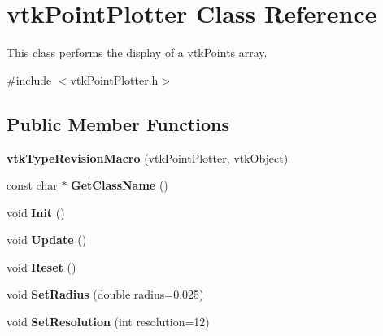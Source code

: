 \hypertarget{classvtkPointPlotter}{
\section{vtkPointPlotter Class Reference}
\label{classvtkPointPlotter}
}


This class performs the display of a vtkPoints array.  


{\ttfamily \#include $<$vtkPointPlotter.h$>$}\subsection*{Public Member Functions}
\begin{DoxyCompactItemize}
\item 
\hypertarget{classvtkPointPlotter_a0708c3a731b70235238305fcec788c9d}{
{\bfseries vtkTypeRevisionMacro} (\hyperlink{classvtkPointPlotter}{vtkPointPlotter}, vtkObject)}
\label{classvtkPointPlotter_a0708c3a731b70235238305fcec788c9d}

\item 
\hypertarget{classvtkPointPlotter_a864e9ad3ebcaae4b6fdedc4c0e666b7b}{
const char $\ast$ {\bfseries GetClassName} ()}
\label{classvtkPointPlotter_a864e9ad3ebcaae4b6fdedc4c0e666b7b}

\item 
\hypertarget{classvtkPointPlotter_a28f6777816c31f9a6934bb7149348e78}{
void {\bfseries Init} ()}
\label{classvtkPointPlotter_a28f6777816c31f9a6934bb7149348e78}

\item 
\hypertarget{classvtkPointPlotter_a086fd3ddc932a01f59596e57e7b80845}{
void {\bfseries Update} ()}
\label{classvtkPointPlotter_a086fd3ddc932a01f59596e57e7b80845}

\item 
\hypertarget{classvtkPointPlotter_a16ab58e612f50555ff575f2b4f00de63}{
void {\bfseries Reset} ()}
\label{classvtkPointPlotter_a16ab58e612f50555ff575f2b4f00de63}

\item 
\hypertarget{classvtkPointPlotter_aeb9ea6d9211adbe11a7acf45ae092a96}{
void {\bfseries SetRadius} (double radius=0.025)}
\label{classvtkPointPlotter_aeb9ea6d9211adbe11a7acf45ae092a96}

\item 
\hypertarget{classvtkPointPlotter_a1e5c27a0311f5955437ba75ea61b9f3d}{
void {\bfseries SetResolution} (int resolution=12)}
\label{classvtkPointPlotter_a1e5c27a0311f5955437ba75ea61b9f3d}


\end{DoxyCompactItemize}
